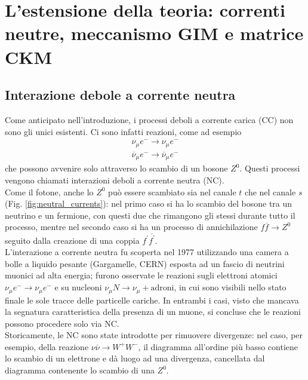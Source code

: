 \documentclass{subnucbo}
\begin{document}
\section{L'estensione della teoria: correnti neutre, meccanismo GIM e matrice CKM}
\subsection{Interazione debole a corrente neutra}
Come anticipato nell'introduzione, i processi deboli a corrente carica (CC) non sono gli unici esistenti. Ci sono infatti reazioni, come ad esempio
\begin{equation}
        \begin{array} { c } { \nu _ { \mu } e ^ { - } \rightarrow \nu _ { \mu } e ^ { - } } \\ { \overline { \nu } _ { \mu } e ^ { - } \rightarrow \overline { \nu } _ { \mu } e ^ { - } } \end{array}
        \label{eq:neutral_current}
\end{equation}
che possono avvenire solo attraverso lo scambio di un bosone $Z^{0}$. Questi processi vengono chiamati interazioni deboli a corrente neutra (NC). \\
Come il fotone, anche lo $Z^{0}$ può essere scambiato sia nel canale $t$ che nel canale $s$ (Fig. \ref{fig:neutral_currents}): nel primo caso si ha lo scambio del bosone tra un neutrino e un fermione, con questi due che rimangono gli stessi durante tutto il processo, mentre nel secondo caso si ha un processo di annichilazione $f \overline { f } \rightarrow Z ^ { 0 }$ seguito dalla creazione di una coppia $f ^ { \prime } \overline { f ^ { \prime } }$. \\
L'interazione a corrente neutra fu scoperta nel 1977 utilizzando una camera a bolle a liquido pesante (Gargamelle, CERN) esposta ad un fascio di neutrini muonici ad alta energia; furono osservate le reazioni sugli elettroni atomici $\nu _ { \mu } e ^ { - } \rightarrow \nu _ { \mu } e ^ { - }$ e su nucleoni $\nu _ { \mu } N \rightarrow \nu _ { \mu } + \text {adroni}$, in cui sono visibili nello stato finale le sole tracce delle particelle cariche. In entrambi i casi, visto che mancava la segnatura caratteristica della presenza di un muone, si concluse che le reazioni possono procedere solo via NC. \\
Storicamente, le NC sono state introdotte per rimuovere divergenze: nel caso, per esempio, della reazione $\nu \overline { \nu } \rightarrow W ^ { + } W ^ { - }$, il diagramma all'ordine più basso contiene lo scambio di un elettrone e dà luogo ad una divergenza, cancellata dal diagramma contenente lo scambio di una $Z^{0}$. \\
\end{document}

